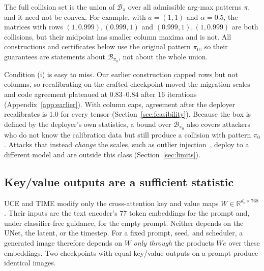 The full collision set is the union of $\mathcal{B}_\pi$ over all admissible arg-max
patterns $\pi$, and it need not be convex. For example, with $a=(1,1)$ and
$\alpha=0.5$, the matrices with rows $(1,0.999),(0.999,1)$ and $(0.999,1),(1,0.999)$ are
both collisions, but their midpoint has smaller column maxima and is not. All
constructions and certificates below use the original pattern $\pi_0$, so their
guarantees are statements about $\mathcal{B}_{\pi_0}$, not about the whole union.

Condition (i) is easy to miss. Our earlier construction capped rows but not columns,
so recalibrating on the crafted checkpoint moved the migration scales and code
agreement plateaued at 0.83--0.84 after 16 iterations (Appendix~\ref{app:earlier}).
With column caps, agreement after the deployer recalibrates is 1.0 for every tensor
(Section~\ref{sec:feasibility}). Because the box is defined by the deployer's own
statistics, a bound over $\mathcal{B}_{\pi_0}$ also covers attackers who do not know
the calibration data but still produce a collision with pattern $\pi_0$. Attacks that instead \emph{change} the scales,
such as outlier injection~\cite{zhan2026}, deploy to a different model and are
outside this class (Section~\ref{sec:limits}).

\subsection{Key/value outputs are a sufficient statistic}
UCE and TIME modify only the cross-attention key and value maps
$W\in\mathbb{R}^{d_o\times768}$. Their inputs are the text encoder's 77 token
embeddings for the prompt and, under classifier-free guidance, for the empty prompt.
Neither depends on the UNet, the latent, or the timestep. For a fixed prompt, seed,
and scheduler, a generated image therefore depends on $W$ \emph{only through} the
products $We$ over these embeddings. Two checkpoints with equal key/value outputs on
a prompt produce identical images.

